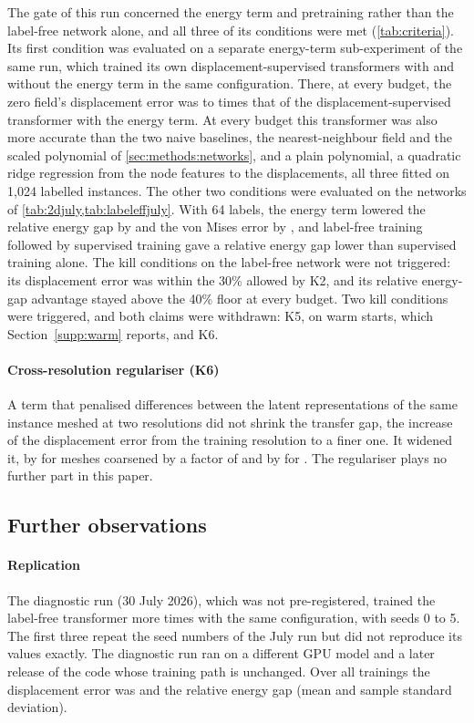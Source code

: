 The gate of this run concerned the energy term and pretraining rather than the label-free
network alone, and all three of its conditions were met (\cref{tab:criteria}). Its first
condition was evaluated on a separate energy-term sub-experiment of the same run, which trained its own
displacement-supervised transformers with and without the energy term in the same configuration. There, at every budget, the
zero field's displacement error was \numGOneSanityMin{} to \numGOneSanityMax{} times that of
the displacement-supervised transformer with the energy term. At every budget this
transformer was also more accurate than the two naive baselines, the nearest-neighbour field and the scaled polynomial of
\cref{sec:methods:networks}, and a plain polynomial, a quadratic ridge regression from the
node features to the displacements, all three fitted on 1,024 labelled instances. The other two conditions were evaluated on the networks of \cref{tab:2djuly,tab:labeleffjuly}. With 64
labels, the energy term lowered the relative
energy gap by \numGOneGapReduction{} and the von Mises error by \numGOneVmReduction{}, and
label-free training followed by supervised training gave a relative energy gap \numGOneFtGap{}
lower than supervised training alone. The kill conditions on the label-free network were
not triggered: its displacement error was within the 30\% allowed by K2, and its relative
energy-gap advantage stayed above the 40\% floor at every budget. Two kill conditions were
triggered, and both claims were withdrawn: K5, on warm starts, which Section~\ref{supp:warm}
reports, and K6.

\paragraph{Cross-resolution regulariser (K6)}
A term that penalised differences between the latent representations of the same instance
meshed at two resolutions did not shrink the transfer gap, the increase of the
displacement error from the training resolution to a finer one. It widened it, by
\numCoarsenHighWiden{} for meshes coarsened by a factor of \numCoarsenHigh{} and by
\numCoarsenLowWiden{} for \numCoarsenLow{}. The regulariser plays no further part in this
paper.

\subsection{Further observations}\label{app:july:other}

\paragraph{Replication}
The diagnostic run (30 July 2026), which was not pre-registered, trained the label-free
transformer \numDiagSeeds{} more times with the same configuration, with seeds 0 to 5. The
first three repeat the seed numbers of the July run but did not reproduce its values exactly. The diagnostic run ran on a different GPU model and a later release of the code
whose training path is unchanged. Over all \numTwoRuns{} trainings the displacement error
was \numTwoRunsDisp{} and the relative energy gap \numTwoRunsGap{} (mean and sample standard
deviation).

